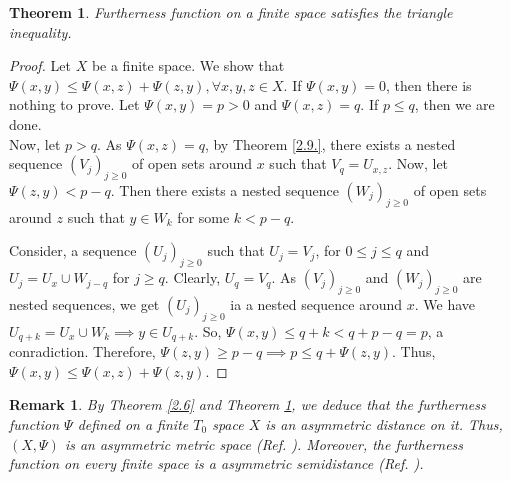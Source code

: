 \documentclass[12pt]{amsart}
\newtheorem{theorem}[definition]{Theorem}
\newtheorem{remark}[definition]{Remark}
\begin{document}
\begin{theorem}\label{2.11.}
	Furtherness function on a finite space satisfies the triangle inequality.
\end{theorem}

\begin{proof} Let $X$ be a finite space. We show that $\Psi(x,y)\leq \Psi(x,z)+\Psi(z,y),\forall x,y,z \in X.$ If $\Psi(x,y)=0$, then there is nothing to prove. Let $\Psi(x,y)=p>0$ and $\Psi(x,z)=q$. If $p\leq q$, then we  are done.\\ 
	Now, let $p>q$. As %
	$\Psi(x,z)=q$, by Theorem \ref{2.9.}, there exists a nested sequence $(V_j)_{j\geq0}$ of open sets around $x$ such that $V_q=U_{x,z}$. %
	Now, let $\Psi(z,y)< p-q$. Then there exists a nested sequence $(W_j)_{j\geq 0}$ of open sets around $z$ such that $y\in W_k$ for some $k<p-q$. \par  %
	Consider, a sequence $(U_j)_{j\geq 0}$ such that $U_j =V_j$, for $0\leq j\leq q$ and $U_j= U_x \cup W_{j-q}$ for $ j\geq q$. Clearly, $U_q
	=V_q$. As $(V_j)_{j\geq 0}$ and $(W_j)_{j\geq 0}$ are nested sequences, we get $(U_j)_{j\geq 0}$ ia a nested sequence around $x$. %
	We have $U_{q+k}=  U_x\cup W_k \implies y\in U_{q+k}.$ So, $\Psi(x,y)\leq q+k <q+p-q =p$, a conradiction. Therefore, $\Psi(z,y)\geq p-q \implies p\leq q+ \Psi(z,y)$. Thus, $\Psi(x,y)\leq \Psi(x,z)+\Psi(z,y)$.
\end{proof}




\begin{remark}\label{2.14.}
	{\normalfont
		By Theorem \ref{2.6} and Theorem \ref{2.11.}, we deduce that the furtherness function $\Psi$ defined on a finite $T_0$  space $X$ is an asymmetric distance on it. Thus,  $(X,\Psi)$ is an asymmetric metric space (Ref. \cite{Mennucci}). Moreover, the furtherness function on every finite space is a asymmetric semidistance (Ref. \cite{Mennucci}). 
	}
\end{remark}
\end{document}
